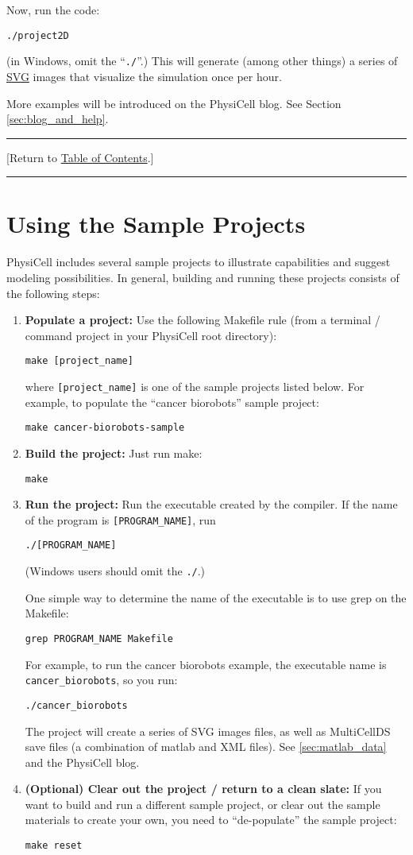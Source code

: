 \documentclass[12pt]{article}
\renewcommand{\v}{\verb}
\newcommand{\TOClink}{\begin{center}\hrule\vskip-10pt\phantom{.}\hfill[Return to \hyperlink{TOC}{Table of Contents}.]\hfill\phantom{.}\vskip3pt\hrule\end{center}}
\begin{document}
Now, run the code: 

\v|./project2D|

(in Windows, omit the ``\v|./|''.) This will generate (among other things) a series of \href{https://en.wikipedia.org/wiki/Scalable_Vector_Graphics}{SVG} images  
that visualize the simulation once per hour. 

More examples will be introduced on the PhysiCell blog. See 
Section \ref{sec:blog_and_help}.

\TOClink

\section{Using the Sample Projects}
\label{sec:sample_projects}
PhysiCell includes several sample projects to illustrate capabilities and 
suggest modeling possibilities. In general, building and running these projects 
consists of the following steps:

\begin{enumerate}
\item 
\textbf{Populate a project:} Use the following Makefile rule (from a terminal / command 
project in your PhysiCell root directory): 

\v|make [project_name]|

where \v|[project_name]| is one of the sample projects listed below. For example, to 
populate the ``cancer biorobots'' sample project: 

\v|make cancer-biorobots-sample|

\item 
\textbf{Build the project:} Just run make:

\v|make|

\item 
\textbf{Run the project:} Run the executable created by the compiler. If the name 
of the program is \v|[PROGRAM_NAME]|, run 

\v|./[PROGRAM_NAME]|

(Windows users should omit the \v|./|.) 

One simple way to determine the name of the executable is to use grep on the Makefile: 

\v|grep PROGRAM_NAME Makefile| 

For example, to run the cancer biorobots example, the executable name is 
\v|cancer_biorobots|, so you run: 

\v|./cancer_biorobots|

The project will create a series of SVG images files, as well as MultiCellDS save files 
(a combination of matlab and XML files). See \ref{sec:matlab_data} and 
the PhysiCell blog.

\item 
\textbf{(Optional) Clear out the project / return to a clean slate:} If you want 
to build and run a different sample project, or clear out the sample materials 
to create your own, you need to ``de-populate'' the sample project: 

\v|make reset|

\end{enumerate}
\end{document}
